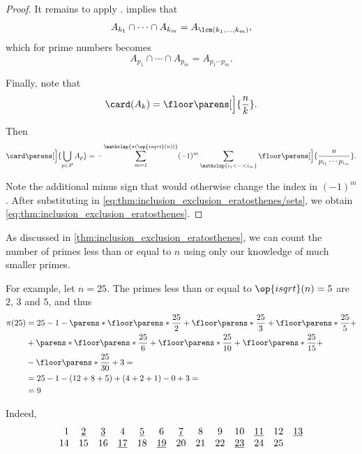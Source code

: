 \begin{proof}
  It remains to apply .  implies that
  \begin{equation*}
    A_{k_1} \cap \cdots \cap A_{k_m} = A_{\lcm(k_1, \ldots,k_m)},
  \end{equation*}
  which for prime numbers becomes
  \begin{equation*}
    A_{p_1} \cap \cdots \cap A_{p_m} = A_{p_1 \cdots p_m}.
  \end{equation*}

  Finally, note that
  \begin{equation*}
    \card(A_k) = \floor\parens[\Big]{ \frac n k }.
  \end{equation*}

  Then
  \begin{equation*}
    \card\parens[\Big]{ \bigcup_{p \in P} A_p } = - \sum_{m=1}^{\mathclap{\pi(\op{isqrt}(n))}} (-1)^m \sum_{\mathclap{i_1 < \cdots < i_m}} \floor\parens[\Big]{ \frac n {p_{i_1} \cdots p_{i_m}} }.
  \end{equation*}

  Note the additional minus sign that would otherwise change the index in \( (-1)^m \). After substituting in \eqref{eq:thm:inclusion_exclusion_eratosthenes/sets}, we obtain \eqref{eq:thm:inclusion_exclusion_eratosthenes}.
\end{proof}

\begin{example}\label{ex:thm:inclusion_exclusion_eratosthenes}
  As discussed in \cref{thm:inclusion_exclusion_eratosthenes}, we can count the number of primes less than or equal to \( n \) using only our knowledge of much smaller primes.

  For example, let \( n = 25 \). The primes less than or equal to \( \op{isqrt}(n) = 5 \) are \( 2 \), \( 3 \) and \( 5 \), and thus
  \begin{align*}
    \pi(25) &= 25 - 1 - \parens*{ \floor\parens*{ \frac {25} 2 } + \floor\parens*{ \frac {25} 3 } + \floor\parens*{ \frac {25} 5 } } + \\
            &+ \parens*{ \floor\parens*{ \frac {25} 6 } + \floor\parens*{ \frac {25} {10} } + \floor\parens*{ \frac {25} {15} } } + \\
            &- \floor\parens*{ \frac {25} {30} } + 3
            = \\ &= 25 - 1 - (12 + 8 + 5) + (4 + 2 + 1) - 0 + 3
            = \\ &= 9
  \end{align*}

  Indeed,
  \begin{equation*}
    \begin{array}{r *{23}{c}}
      1  & \underline{2} & \underline{3} & 4       & \underline{5} & 6       & \underline{7} & 8  & 9  & 10      & \underline{11} & 12 & \underline{13} \\
      14 & 15     & 16     & \underline{17} & 18     & \underline{19} & 20     & 21 & 22 & \underline{23} & 24      & 25 &
    \end{array}
  \end{equation*}
\end{example}

